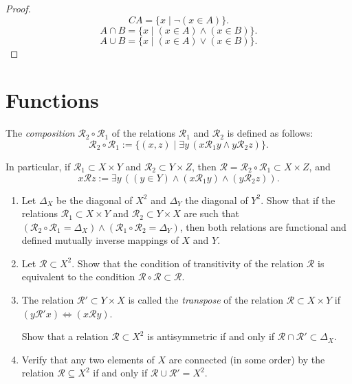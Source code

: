\begin{proof}
    \[
        CA = \{ x \mid \neg(x\in A) \}.
    \]
    \[
        A\cap B = \{ x \mid (x\in A)\land (x\in B) \}.
    \]
    \[
        A\cup B = \{ x \mid (x\in A)\lor (x\in B) \}.
    \]
\end{proof}
\newpage

\section{Functions}

\begin{exercise}
    The \textit{composition} $\mathcal{R}_{2}\circ \mathcal{R}_{1}$ of the relations $\mathcal{R}_{1}$ and $\mathcal{R}_{2}$ is defined as follows:
    \[
        \mathcal{R}_{2}\circ\mathcal{R}_{1} := \{ (x, z) \mid \exists y\, (x\mathcal{R}_{1}y \land y\mathcal{R}_{2}z) \}.
    \]

    In particular, if $\mathcal{R}_{1}\subset X\times Y$ and $\mathcal{R}_{2}\subset Y\times Z$, then $\mathcal{R} = \mathcal{R}_{2}\circ \mathcal{R}_{1}\subset X\times Z$, and
    \[
        x\mathcal{R}z := \exists y\, \left((y\in Y)\land (x\mathcal{R}_{1}y)\land (y\mathcal{R}_{2}z)\right).
    \]

    \begin{enumerate}[label={(\alph*)}]
        \item Let $\Delta_{X}$ be the diagonal of $X^{2}$ and $\Delta_{Y}$ the diagonal of $Y^{2}$. Show that if the relations $\mathcal{R}_{1}\subset X\times Y$ and $\mathcal{R}_{2}\subset Y\times X$ are such that $(\mathcal{R}_{2}\circ\mathcal{R}_{1} = \Delta_{X})\land (\mathcal{R}_{1}\circ\mathcal{R}_{2} = \Delta_{Y})$, then both relations are functional and defined mutually inverse mappings of $X$ and $Y$.
        \item Let $\mathcal{R}\subset X^{2}$. Show that the condition of transitivity of the relation $\mathcal{R}$ is equivalent to the condition $\mathcal{R}\circ \mathcal{R}\subset \mathcal{R}$.
        \item The relation $\mathcal{R}'\subset Y\times X$ is called the \textit{transpose} of the relation $\mathcal{R}\subset X\times Y$ if $(y\mathcal{R}'x) \Leftrightarrow (x\mathcal{R}y)$.

              Show that a relation $\mathcal{R}\subset X^{2}$ is antisymmetric if and only if $\mathcal{R}\cap \mathcal{R}'\subset \Delta_{X}$.
        \item Verify that any two elements of $X$ are connected (in some order) by the relation $\mathcal{R} \subseteq X^{2}$ if and only if $\mathcal{R}\cup \mathcal{R}' = X^{2}$.
    \end{enumerate}
\end{exercise}

